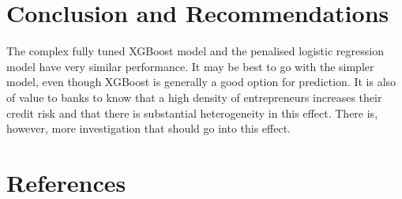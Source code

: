\documentclass[11pt,preprint, authoryear]{elsarticle}
\numberwithin{equation}{section}
\numberwithin{figure}{section}
\numberwithin{table}{section}
\begin{document}
\hypertarget{conclusion-and-recommendations}{%
\section{Conclusion and
Recommendations}\label{conclusion-and-recommendations}}

The complex fully tuned XGBoost model and the penalised logistic
regression model have very similar performance. It may be best to go
with the simpler model, even though XGBoost is generally a good option
for prediction. It is also of value to banks to know that a high density
of entrepreneurs increases their credit risk and that there is
substantial heterogeneity in this effect. There is, however, more
investigation that should go into this effect.

\newpage

\hypertarget{references}{%
\section*{References}\label{references}}
\end{document}
